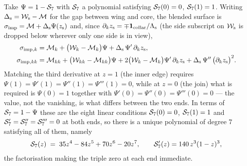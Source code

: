 Take $\Psi=1-\mathcal{S}_{7}$ with $\mathcal{S}_{7}$ a polynomial satisfying $\mathcal{S}_{7}(0)=0$, $\mathcal{S}_{7}(1)=1$. Writing
$\Delta_{\mathrm{s}}=\mathcal{W}_{\mathrm{s}}-\mathcal{M}$ for the gap between wing and core, the blended surface
is $\sigma_{\mathrm{imp}}=\mathcal{M}+\Delta_{\mathrm{s}}\Psi(z_{\mathrm{s}})$ and, since
$\partial_{k}z_{\mathrm{s}}=\mp\mathbf{1}_{\mathrm{collar}}/\Lambda_{\mathrm{s}}$ (the side subscript on
$\mathcal{W}_{\mathrm{s}}$ is dropped below wherever only one side is in view),
\begin{align}
  \sigma_{\mathrm{imp},k}   &= \mathcal{M}_{k} + \bigl(\mathcal{W}_{k}-\mathcal{M}_{k}\bigr)\Psi
               + \Delta_{\mathrm{s}}\,\Psi'\,\partial_{k}z_{\mathrm{s}},\\
  \sigma_{\mathrm{imp},kk}&= \mathcal{M}_{kk} + \bigl(\mathcal{W}_{kk}-\mathcal{M}_{kk}\bigr)\Psi
               + 2\bigl(\mathcal{W}_{k}-\mathcal{M}_{k}\bigr)\Psi'\,\partial_{k}z_{\mathrm{s}}
               + \Delta_{\mathrm{s}}\,\Psi''\,\bigl(\partial_{k}z_{\mathrm{s}}\bigr)^{2}.
\end{align}
Matching the third derivative at $z=1$ (the inner edge) requires
$\Psi(1)=\Psi'(1)=\Psi''(1)=\Psi'''(1)=0$, while at $z=0$ (the join) what is required is
$\Psi(0)=1$ together with $\Psi'(0)=\Psi''(0)=\Psi'''(0)=0$ --- the value, not the vanishing, is what
differs between the two ends. In terms of $\mathcal{S}_{7}=1-\Psi$ these are the eight linear conditions
$\mathcal{S}_{7}(0)=0$, $\mathcal{S}_{7}(1)=1$ and $\mathcal{S}_{7}'=\mathcal{S}_{7}''=\mathcal{S}_{7}'''=0$ at both ends, so there is a
unique polynomial of degree $7$ satisfying all of them, namely
\begin{equation}
  \mathcal{S}_{7}(z)\;=\;35z^{4}-84z^{5}+70z^{6}-20z^{7},
  \qquad \mathcal{S}_{7}'(z)=140\,z^{3}(1-z)^{3},
  \label{eq:septic}
\end{equation}
the factorisation making the triple zero at each end immediate.



